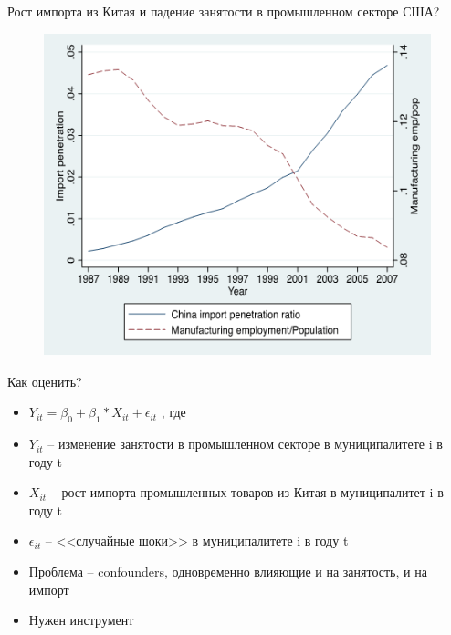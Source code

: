 \begin{frame}{Рост импорта из Китая и падение занятости в промышленном секторе США? \parencite{autor2013china}}
  \begin{figure}
   \centering
    \includegraphics[width=\textwidth]{Lecture_Sources/Images/Bartik_import.png}
  \end{figure}
\end{frame}



\begin{frame}{Как оценить?}
  \begin{itemize}
      \item$Y_{it}=\beta_0+\beta_1*X_{it}+\epsilon_{it}$ , где
      \item $Y_{it}$ -- изменение занятости в промышленном секторе в муниципалитете i в году t
      \item $X_{it}$ -- рост импорта промышленных товаров из Китая в муниципалитет i в году t
      \item $\epsilon_{it}$ -- <<случайные шоки>> в муниципалитете i в году t
      \item Проблема -- confounders, одновременно влияющие и на занятость, и на импорт
      \item Нужен инструмент
  \end{itemize}
\end{frame}

